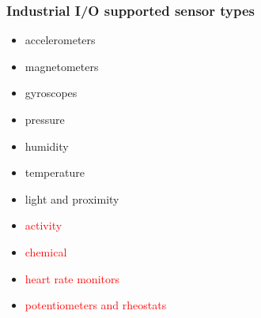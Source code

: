 \documentclass[aspectratio=169]{beamer}
\begin{document}

\begin{frame}
\frametitle{Industrial I/O supported sensor types}
\begin{itemize}
    \item accelerometers
    \item magnetometers
    \item gyroscopes
    \item pressure
    \item humidity
    \item temperature
    \item light and proximity
    \item \textcolor{red}{activity}
    \item \textcolor{red}{chemical}
    \item \textcolor{red}{heart rate monitors}
    \item \textcolor{red}{potentiometers and rheostats}
\end{itemize}
\end{frame}



\end{document}
